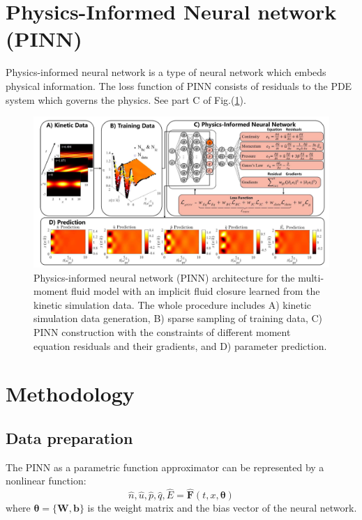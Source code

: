 \documentclass{article}
\begin{document}
    \section{Physics-Informed Neural network (PINN)}
    Physics-informed neural network is a type of neural network which embeds physical information. The loss function of PINN consists of residuals to the PDE system which governs the physics. \cite{qin_data-driven_2022} See part C of Fig.(\ref{fig:pinn_architecture}).

    \begin{figure} [H]
        \centering
        \includegraphics[width=\textwidth]{img/pinn_architecture.png}
        \caption{Physics-informed neural network (PINN) architecture for the multi-moment fluid model with an implicit fluid closure learned from the kinetic simulation data. The whole procedure includes A) kinetic simulation data generation, B) sparse sampling of training data, C) PINN construction with the constraints of different moment equation residuals and their gradients, and D) parameter prediction.}
        \label{fig:pinn_architecture}
    \end{figure}

    \section{Methodology}
    \subsection{Data preparation}
    The PINN as a parametric function approximator can be represented by a nonlinear function:
    \begin{equation} \label{eq:approximator}
        \hat{n},\hat{u},\hat{p},\hat{q},\hat{E} = \hat{\mathbf{F}}(t,x,\mathbf{\theta})
    \end{equation}
    where $\mathbf{\theta}=\{\mathbf{W,b}\}$ is the weight matrix and the bias vector of the neural network.
\end{document}
